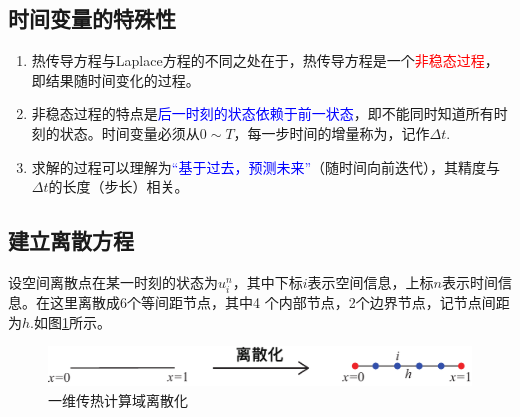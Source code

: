 \subsection{时间变量的特殊性}
\begin{enumerate}[1. ]
	\item 热传导方程与Laplace方程的不同之处在于，热传导方程是一个\textcolor{red}{非稳态过程}，即结果随时间变化的过程。\vspace*{-0.5em}
	\item 非稳态过程的特点是\textcolor{blue}{后一时刻的状态依赖于前一状态}，即不能同时知道所有时刻的状态。时间变量必须从$0\sim T$，每一步时间的增量称为，记作$\Delta t$.\vspace*{-0.5em}
	\item 求解的过程可以理解为\textcolor{blue}{“基于过去，预测未来”}（随时间向前迭代），其精度与$\Delta t$的长度（步长）相关。
\end{enumerate}

\subsection{建立离散方程}
设空间离散点在某一时刻的状态为$u_i^n$，其中下标$i$表示空间信息，上标$n$表示时间信息。在这里离散成6个等间距节点，其中4 个内部节点，2个边界节点，记节点间距为$h$.如图\ref{一维差分传热}所示。
\begin{figure}[!htb]
	\centering
	\includegraphics[width=0.6\linewidth]{pic/一维差分传热.pdf}
	\caption{一维传热计算域离散化}
	\label{一维差分传热}
\end{figure}

